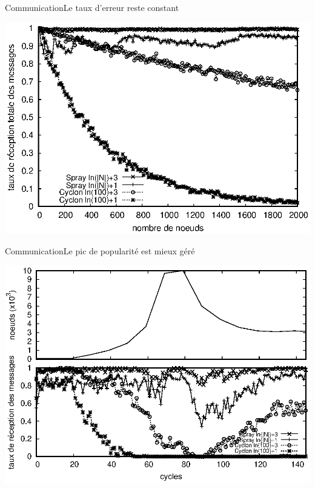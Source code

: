 \begin{frame}{Communication}{Le taux d'erreur reste constant}
  \begin{center}
    \includegraphics[width=1\textwidth]{img/network/hardrate.eps}
  \end{center} 
\end{frame}


\begin{frame}{Communication}{Le pic de popularité est mieux géré}
  \begin{center}
    \includegraphics[width=1\textwidth]{img/network/peak.eps}
  \end{center} 
\end{frame}


